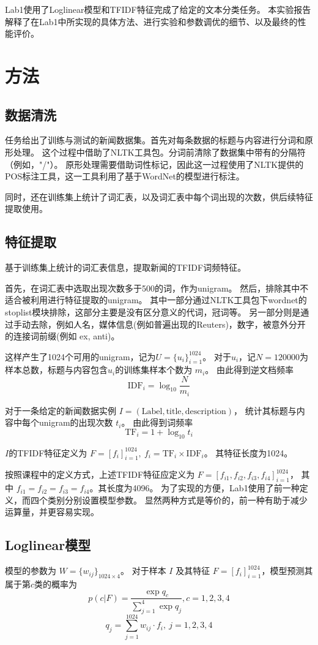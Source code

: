 \documentclass[12pt,letterpaper]{article}
\begin{document}
Lab1使用了Loglinear模型和TFIDF特征完成了给定的文本分类任务。
本实验报告解释了在Lab1中所实现的具体方法、进行实验和参数调优的细节、以及最终的性能评价。

\section{方法}
\subsection{数据清洗}
任务给出了训练与测试的新闻数据集。首先对每条数据的标题与内容进行分词和原形处理。
这个过程中借助了NLTK工具包。分词前清除了数据集中带有的分隔符（例如，"/"）。
原形处理需要借助词性标记，因此这一过程使用了NLTK提供的POS标注工具，这一工具利用了基于WordNet的模型进行标注。

同时，还在训练集上统计了词汇表，以及词汇表中每个词出现的次数，供后续特征提取使用。

\subsection{特征提取}
基于训练集上统计的词汇表信息，提取新闻的TFIDF词频特征。

首先，在词汇表中选取出现次数多于500的词，作为unigram。
然后，排除其中不适合被利用进行特征提取的unigram。
其中一部分通过NLTK工具包下wordnet的stoplist模块排除，这部分主要是没有区分意义的代词，冠词等。
另一部分则是通过手动去除，例如人名，媒体信息(例如普遍出现的Reuters)，数字，被意外分开的连接词前缀(例如 ex, anti)。

这样产生了1024个可用的unigram，记为$U = \{u_i\}_{i=1}^{1024}$。
对于$u_i$，记$N=120000$为样本总数，标题与内容包含$u_i$的训练集样本个数为 $m_i$。
由此得到逆文档频率 $$\text{IDF}_i = \log_{10}\frac{N}{m_i}$$

对于一条给定的新闻数据实例 $I=(\text{Label}, \text{title}, \text{description})$，
统计其标题与内容中每个unigram的出现次数 $t_i$。
由此得到词频率 $$ \text{TF}_i = 1 + \log_{10} t_i $$

$I$的TFIDF特征定义为 $F = [f_i]_{i=1}^{1024},\  f_i=\text{TF}_i \times \text{IDF}_i$。
其特征长度为1024。

按照课程中的定义方式，上述TFIDF特征应定义为 $F=[f_{i1}, f_{i2}, f_{i3}, f_{i4}]_{i=1}^{1024}$，
其中 $f_{i1}=f_{i2}=f_{i3}=f_{i4}$。其长度为4096。
为了实现的方便，Lab1使用了前一种定义，而四个类别分别设置模型参数。
显然两种方式是等价的，前一种有助于减少运算量，并更容易实现。

\subsection{Loglinear模型}
模型的参数为 $W=\{w_{ij}\}_{1024 \times 4}$。
对于样本 $I$ 及其特征 $F=[f_i]_{i=1}^{1024}$，模型预测其属于第$c$类的概率为
$$p(c|F) = \frac{\exp{q_c}}{\sum_{j=1}^4 \exp{q_j}}, c=1,2,3,4$$
$$q_j = \sum_{j=1}^{1024} w_{ij} \cdot f_i,\  j=1,2,3,4$$
\end{document}
